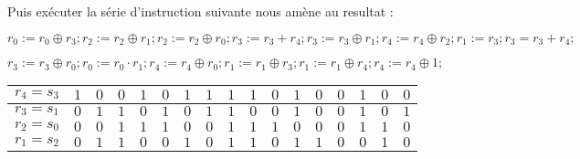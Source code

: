 \documentclass{article}
\begin{document}
Puis exécuter la série d'instruction suivante nous amène au resultat : 

$r_{0}:=r_{0}\oplus r_{3};r_{2}:=r_{2}\oplus r_{1};r_{2}:=r_{2}\oplus r_{0};r_{3}:=r_{3}+r_{4};r_{3}:=r_{3}\oplus r_{1};r_{4}:=r_{4}\oplus r_{2}; r_{1}:=r_{3}; r_{3}=r_{3}+r_{4};$

$ r_{3}:=r_{3}\oplus r_{0}; r_{0}:=r_{0}\cdot r_{1}; r_{4}:=r_{4}\oplus r_{0}; r_{1}:=r_{1}\oplus r_{3}; r_{1}:=r_{1}\oplus r_{4}; r_{4}:=r_{4}\oplus 1 ;
$\medbreak
\begin{center}
\begin{tabular}{|l|l|l|l|l|l|l|l|l|l|l|l|l|l|l|l|l|}
\hline
\multicolumn{1}{|l|}{$r_{4}=s_{3}$}&	\multicolumn{1}{|l|}{ $1$}&	\multicolumn{1}{|l|}{ $0$}&	\multicolumn{1}{|l|}{ $0$}&	\multicolumn{1}{|l|}{ $1$}&	\multicolumn{1}{|l|}{ $0$}&	\multicolumn{1}{|l|}{ $1$}&	\multicolumn{1}{|l|}{ $1$}&	\multicolumn{1}{|l|}{ $1$}&	\multicolumn{1}{|l|}{ $1$}&	\multicolumn{1}{|l|}{ $0$}&	\multicolumn{1}{|l|}{ $1$}&	\multicolumn{1}{|l|}{ $0$}&	\multicolumn{1}{|l|}{ $0$}&	\multicolumn{1}{|l|}{ $1$}&	\multicolumn{1}{|l|}{ $0$}&	\multicolumn{1}{|l|}{ $0$}	\\
\hline
\multicolumn{1}{|l|}{ $r_{3}=s_{1}$}&	\multicolumn{1}{|l|}{ $0$}&	\multicolumn{1}{|l|}{ $1$}&	\multicolumn{1}{|l|}{ $1$}&	\multicolumn{1}{|l|}{ $0$}&	\multicolumn{1}{|l|}{ $1$}&	\multicolumn{1}{|l|}{ $0$}&	\multicolumn{1}{|l|}{ $1$}&	\multicolumn{1}{|l|}{ $1$}&	\multicolumn{1}{|l|}{ $0$}&	\multicolumn{1}{|l|}{ $0$}&	\multicolumn{1}{|l|}{ $1$}&	\multicolumn{1}{|l|}{ $0$}&	\multicolumn{1}{|l|}{ $0$}&	\multicolumn{1}{|l|}{ $1$}&	\multicolumn{1}{|l|}{ $0$}&	\multicolumn{1}{|l|}{ $1$}	\\
\hline
\multicolumn{1}{|l|}{ $r_{2}=s_{0}$}&	\multicolumn{1}{|l|}{ $0$}&	\multicolumn{1}{|l|}{ $0$}&	\multicolumn{1}{|l|}{ $1$}&	\multicolumn{1}{|l|}{ $1$}&	\multicolumn{1}{|l|}{ $1$}&	\multicolumn{1}{|l|}{ $0$}&	\multicolumn{1}{|l|}{ $0$}&	\multicolumn{1}{|l|}{ $1$}&	\multicolumn{1}{|l|}{ $1$}&	\multicolumn{1}{|l|}{ $1$}&	\multicolumn{1}{|l|}{ $0$}&	\multicolumn{1}{|l|}{ $0$}&	\multicolumn{1}{|l|}{ $0$}&	\multicolumn{1}{|l|}{ $1$}&	\multicolumn{1}{|l|}{ $1$}&	\multicolumn{1}{|l|}{ $0$}	\\
\hline
\multicolumn{1}{|l|}{ $r_{1}=s_{2}$}&	\multicolumn{1}{|l|}{ $0$}&	\multicolumn{1}{|l|}{ $1$}&	\multicolumn{1}{|l|}{ $1$}&	\multicolumn{1}{|l|}{ $0$}&	\multicolumn{1}{|l|}{ $0$}&	\multicolumn{1}{|l|}{ $1$}&	\multicolumn{1}{|l|}{ $0$}&	\multicolumn{1}{|l|}{ $1$}&	\multicolumn{1}{|l|}{ $1$}&	\multicolumn{1}{|l|}{ $0$}&	\multicolumn{1}{|l|}{ $1$}&	\multicolumn{1}{|l|}{ $1$}&	\multicolumn{1}{|l|}{ $0$}&	\multicolumn{1}{|l|}{ $0$}&	\multicolumn{1}{|l|}{ $1$}&	\multicolumn{1}{|l|}{ $0$}	\\

\end{tabular}
\end{center}
\end{document}
